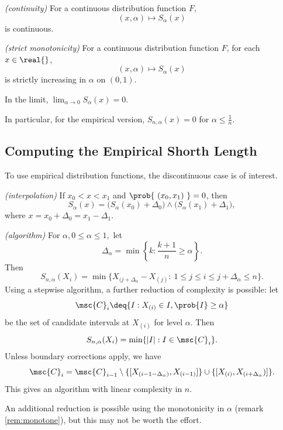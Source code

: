 \documentclass[dvips,12pt,a4paper,twoside]{amsart}
\begin{document}
\begin{rem}\emph{(continuity)}
For a continuous distribution function $F$,
$$
(x,\alpha) \mapsto S_\alpha(x)
$$
is continuous.
\end{rem}
%
\begin{rem}\emph{(strict monotonicity)}\label{rem:monotone}
For a continuous distribution function $F$, for each $x \in \real{}$,
$$
(x,\alpha) \mapsto S_\alpha(x)
$$
is strictly increasing in $\alpha$ on $(0, 1)$.
\end{rem}


In the limit,  $\lim_{\alpha \rightarrow 0} S_\alpha(x) =0$. 

In particular, for the empirical version, $S_{n, 
\alpha}(x) =0$ for $\alpha \leq \frac{1}{n}$.

%
%
\subsection{Computing the Empirical Shorth Length}
To use empirical distribution functions, the discontinuous case is of interest.

\begin{rem}\emph{(interpolation)}\label{rem:interpolation}
If $x_0 < x < x_1$ and $\prob{\ \left( x_0, x_1 \right)\  }=0$, then 
$$S_{\alpha}(x) = \big(S_{\alpha}\left(x_0\right) + \Delta_0\big) \wedge 
\big(S_{\alpha}\left(x_1\right) + \Delta_1\big),$$
where $x= x_0 + \Delta_0 = x_1 - \Delta_1$.
\end{rem}
%
\begin{rem}\emph{(algorithm)}\label{rem:algo}
For $\alpha, 0 \leq \alpha \leq 1,$ let 
$$\Delta_{\alpha} = \min\left\{k: \frac{k+1}{n} \geq \alpha\right\}.$$
Then
$$
S_{n,\alpha}(X_{i})= \min \{X_{(j+\Delta_{\alpha}} - X_{(j)} : \ 1 \leq j \leq i \leq j+\Delta_{\alpha} \leq n\}.
$$
Using a stepwise algorithm, a further reduction of complexity is possible: 
let 
$$\msc{C}_i \deq \{ I : X_{(i)} \in I, \prob{I} \geq	 \alpha\}$$
be the set of candidate intervals at $X_{(i)}$ for level $\alpha$. 
Then
$$S_{n,\alpha}(X_{i}) = \min\{|I|: I \in \msc{C}_i \}.$$
Unless boundary corrections apply, we have
$$\msc{C}_i = \msc{C}_{i-1} \setminus \{ [X_{(i-1-\Delta_{\alpha})}, X_{(i-1)}] \} 
\cup \{ [X_{(i)}, X_{(i+\Delta_{\alpha}})] \}.$$ 
This gives an algorithm with linear complexity in $n$.

\end{rem}

An additional reduction is possible using the monotonicity in $\alpha$ (remark \ref{rem:monotone}), but this may not be worth the effort.
%
%
%
\end{document}
